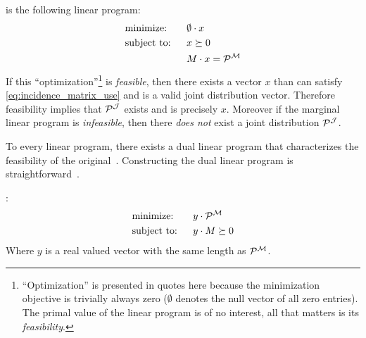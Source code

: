 \documentclass[aps, 10pt, english, twoside, pra, nofootinbib, tightenlines, longbibliography]{revtex4-1}
\begin{document}
    \begin{definition}
        \label{def:marginal_linear_program}
         is the following linear program:
        \begin{alignat*}{2}
            & \text{minimize:} \quad&& \emptyset \cdot x\\
            & \text{subject to:} && x \succeq 0 \\
            & && M \cdot x = \probvec^{\mscenario}
        \end{alignat*}
        If this ``optimization''\footnote{``Optimization'' is presented in quotes here because the minimization objective is trivially always zero ($\emptyset$ denotes the null vector of all zero entries). The primal value of the linear program is of no interest, all that matters is its \textit{feasibility}.} is \textit{feasible}, then there exists a vector $x$ than can satisfy \cref{eq:incidence_matrix_use} and is a valid joint distribution vector. Therefore feasibility implies that $\probvec^{\jointvar}$ exists and is precisely $x$. Moreover if the marginal linear program is \textit{infeasible}, then there \textit{does not} exist a joint distribution $\probvec^{\jointvar}$.
    \end{definition}

    To every linear program, there exists a dual linear program that characterizes the feasibility of the original~\cite{Schrijver_1998}. Constructing the dual linear program is straightforward~\cite{Lahaie_2008}.

    \begin{definition}
        \label{def:dual_marginal_linear_program}
        :
        \begin{alignat*}{2}
            & \text{minimize:} \quad&& y \cdot \probvec^{\mscenario}\\
            & \text{subject to:} && y \cdot M \succeq 0
        \end{alignat*}
        Where $y$ is a real valued vector with the same length as $\probvec^{\mscenario}$.
    \end{definition}
\end{document}

